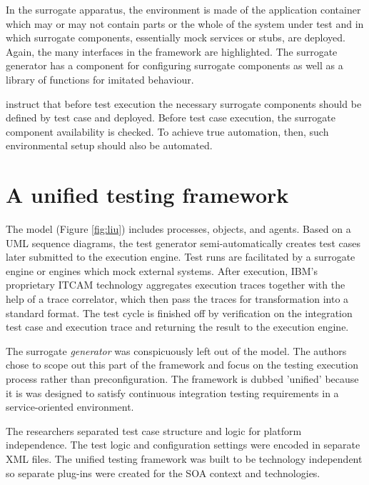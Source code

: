\documentclass[12pt,a4paper,oneside,pdftex]{report}
\begin{document}
In the surrogate apparatus, the environment is made of the application container which may or may not contain parts or the whole of the system under test and in which surrogate components, essentially mock services or stubs, are deployed. Again, the many interfaces in the framework are highlighted. The surrogate generator has a component for configuring surrogate components as well as a library of functions for imitated behaviour.

\citet{huang2008surrogate} instruct that before test execution the necessary surrogate components should be defined by test case and deployed. Before test case execution, the surrogate component availability is checked. To achieve true automation, then, such environmental setup should also be automated.


\section{A unified testing framework}

The \citet{liu2009unified} model (Figure \ref{fig:liu}) includes processes, objects, and agents. Based on a UML sequence diagrams, the test generator semi-automatically creates test cases later submitted to the execution engine. Test runs are facilitated by a surrogate engine or engines which mock external systems. After execution, IBM's proprietary ITCAM technology aggregates execution traces together with the help of a trace correlator, which then pass the traces for transformation into a standard format. The test cycle is finished off by verification on the integration test case and execution trace and returning the result to the execution engine.

The surrogate \emph{generator} was conspicuously left out of the model. The authors chose to scope out this part of the framework and focus on the testing execution process rather than preconfiguration. The framework is dubbed 'unified' because it is was designed to satisfy continuous integration testing requirements in a service-oriented environment.

The researchers separated test case structure and logic for platform independence. The test logic and configuration settings were encoded in separate XML files. The unified testing framework was built to be technology independent so 
separate plug-ins were created for the SOA context and technologies.
\end{document}
